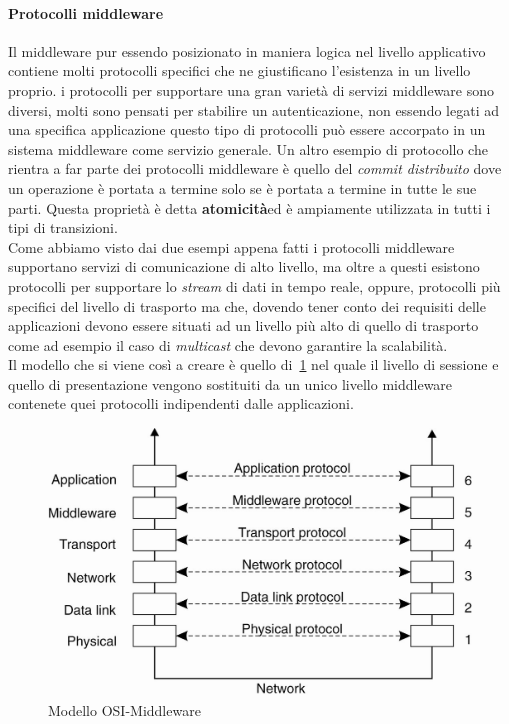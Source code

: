 \paragraph{Protocolli middleware}
Il middleware pur essendo posizionato in maniera logica nel livello applicativo contiene molti protocolli specifici che ne giustificano l'esistenza in un livello proprio. i protocolli per supportare una gran varietà di servizi middleware sono diversi, molti sono pensati per stabilire un autenticazione, non essendo legati ad una specifica applicazione questo tipo di protocolli può essere accorpato in un sistema middleware come servizio generale.
Un altro esempio di protocollo che rientra a far parte dei protocolli middleware è quello del \emph{commit distribuito} dove un operazione è portata a termine solo se è portata a termine in tutte le sue parti. Questa proprietà è detta \textbf{atomicità}ed è ampiamente utilizzata in tutti i tipi di transizioni.\\
Come abbiamo visto dai due esempi appena fatti i protocolli middleware supportano servizi di comunicazione di alto livello, ma oltre a questi esistono protocolli per supportare lo \emph{stream} di dati in tempo reale, oppure, protocolli più specifici del livello di trasporto ma che, dovendo tener conto dei requisiti delle applicazioni devono essere situati ad un livello più alto di quello di trasporto come ad esempio il caso di \emph{multicast} che devono garantire la scalabilità.\\
Il modello che si viene così a creare è quello di \figurename\,\ref{img:osimid} nel quale il livello di sessione e quello di presentazione vengono sostituiti da un unico livello middleware contenete quei protocolli indipendenti dalle applicazioni.
\begin{figure}
\centering
\includegraphics[scale=0.5]{img/osimid.png}
\caption{Modello OSI-Middleware}\label{img:osimid}
\end{figure}
